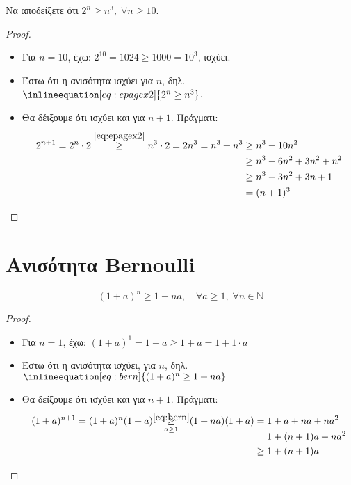 \documentclass[main.tex]{subfiles}
\begin{document}
\begin{example}
    Να αποδείξετε ότι $ 2^{n} \geq n^{3}, \; \forall n \geq 10 $.
    \begin{proof}
    \item {}
        \begin{itemize}
            \item Για $ n=10 $, έχω: $ 2^{10} = 1024 \geq 1000 = 10^{3}  $, 
                ισχύει.
            \item Έστω ότι η ανισότητα ισχύει για $n$, δηλ. 
                $\inlineequation[eq:epagex2]{2^{n} \geq n^{3}}$.
            \item Θα δέιξουμε ότι ισχύει και για $ n+1 $. Πράγματι:
               \begin{align*}
                   2^{n+1} = 2^{n} \cdot 2 \overset{\eqref{eq:epagex2}}{\geq} n^{3} 
                   \cdot 2 = 2n^{3} = n^{3} + n^{3} &\geq n^{3} + 10n^{2} \\
                                 &\geq n^{3} + 6n^{2} + 3n^{2} + n^{2} \\ 
                                 &\geq n^{3} + 3n^{2} + 3n + 1 \\ 
                                 &= (n+1)^{3}
               \end{align*} 
        \end{itemize}
    \end{proof}
\end{example}

\section{Ανισότητα Bernoulli}
\[
    \boxed{(1+a)^{n} \geq 1 + na, \quad \forall a \geq 1, \; \forall n \in
    \mathbb{N}}
 \] 
 \begin{proof}
     \begin{itemize}
         \item Για $ n=1 $, έχω: $ (1+a)^{1} = 1+a \geq 1+a = 1 + 1 \cdot a $
         \item Έστω ότι η ανισότητα ισχύει, για $ n $, δηλ. $\inlineequation[eq:bern]
             {(1+a)^{n} \geq 1 + na}$
         \item Θα δείξουμε ότι ισχύει και για $ n+1 $. Πράγματι:
             \begin{align*}
                 (1+a)^{n+1} = (1+a)^{n}(1+a) \overset{\eqref{eq:bern}}
                 {\smash{\underset{a \geq 1}{\geq}}}
                 (1+na)(1+a) &= 1 + a + na + na^{2} \\
                             &= 1 + (n+1)a + na^{2} \\
                             &\geq 1 + (n+1)a
             \end{align*}

     \end{itemize}
 \end{proof}
\end{document}
